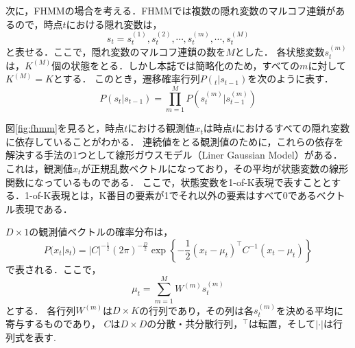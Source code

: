 次に，FHMMの場合を考える．FHMMでは複数の隠れ変数のマルコフ連鎖があるので，時点$t$における隠れ変数は，
\begin{equation}
  s_{t} = s_{t}^{(1)},s_{t}^{(2)},\cdots, s_{t}^{(m)}, \cdots, s_{t}^{(M)}
\end{equation}
と表せる．ここで，隠れ変数のマルコフ連鎖の数を$M$とした．
各状態変数$s_{t}^{(m)}$は，$K^{(M)}$個の状態をとる．しかし本誌では簡略化のため，すべての$m$に対して$K^{(M)} = K$とする．
このとき，遷移確率行列$P(_{t} | s_{t-1})$を次のように表す．
\begin{equation}
  P(s_{t} | s_{t-1}) = \prod_{m=1}^{M} P(s_{t}^{(m)} | s_{t-1}^{(m)})
\end{equation}

図\ref{fig:fhmm}を見ると，時点$t$における観測値$x_{t}$は時点$t$におけるすべての隠れ変数に依存していることがわかる．
連続値をとる観測値のために，これらの依存を解決する手法の1つとして線形ガウスモデル（Liner Gaussian Model）がある．
これは，観測値$x_{t}$が正規乱数ベクトルになっており，その平均が状態変数の線形関数になっているものである．
ここで，状態変数を1-of-K表現で表すこととする．1-of-K表現とは，K番目の要素が1でそれ以外の要素はすべて0であるベクトル表現である．

$D \times 1$の観測値ベクトルの確率分布は，
\begin{equation}
  P(x_{t} | s_{t}) = |C|^{-\frac{1}{2}} (2\pi)^{-\frac{D}{2}} \exp \left\{- \frac{1}{2} (x_{t} - \mu_{t})^{\top} C^{-1} (x_{t} - \mu_{t}) \right\}
\end{equation}
で表される．ここで，
\begin{equation}
  \mu_{t} = \sum_{m=1}^{M} W^{(m)} s_{t}^{(m)}
\end{equation}
とする．
各行列$W^{(m)}$は$D \times K$の行列であり，その列は各$s_{t}^{(m)}$を決める平均に寄与するものであり，
$C$は$D \times D$の分散・共分散行列，$^{\top}$は転置，そして$| \cdot |$は行列式を表す.
